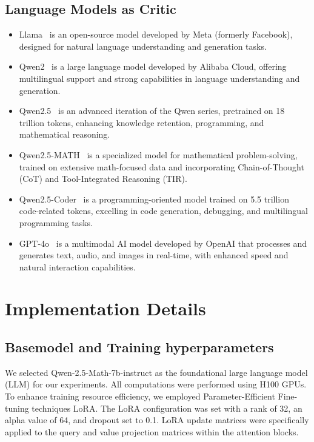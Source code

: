 \subsection{Language Models as Critic}
\begin{itemize}[leftmargin=10pt] 
\item Llama~\cite{dubey2024llama} is an open-source model developed by Meta (formerly Facebook), designed for natural language understanding and generation tasks. 
\item Qwen2~\cite{yang2024qwen2} is a large language model developed by Alibaba Cloud, offering multilingual support and strong capabilities in language understanding and generation. \item Qwen2.5~\cite{qwen2.5} is an advanced iteration of the Qwen series, pretrained on 18 trillion tokens, enhancing knowledge retention, programming, and mathematical reasoning. 
\item Qwen2.5-MATH~\cite{yang2024qwen25mathtechnicalreportmathematical} is a specialized model for mathematical problem-solving, trained on extensive math-focused data and incorporating Chain-of-Thought (CoT) and Tool-Integrated Reasoning (TIR). 
\item Qwen2.5-Coder~\cite{hui2024qwen25codertechnicalreport} is a programming-oriented model trained on 5.5 trillion code-related tokens, excelling in code generation, debugging, and multilingual programming tasks. 
\item GPT-4o~\cite{openai2024gpt4ocard} is a multimodal AI model developed by OpenAI that processes and generates text, audio, and images in real-time, with enhanced speed and natural interaction capabilities. 
\end{itemize}



\section{Implementation Details}
\label{app:implementation details}
\subsection{Basemodel and Training hyperparameters}

We selected Qwen-2.5-Math-7b-instruct\cite{qwen2.5} as the foundational large language model (LLM) for our experiments. All computations were performed using H100 GPUs. To enhance training resource efficiency, we employed Parameter-Efficient Fine-tuning techniques LoRA. The LoRA configuration was set with a rank of 32, an alpha value of 64, and dropout set to 0.1. LoRA update matrices were specifically applied to the query and value projection matrices within the attention blocks. 

